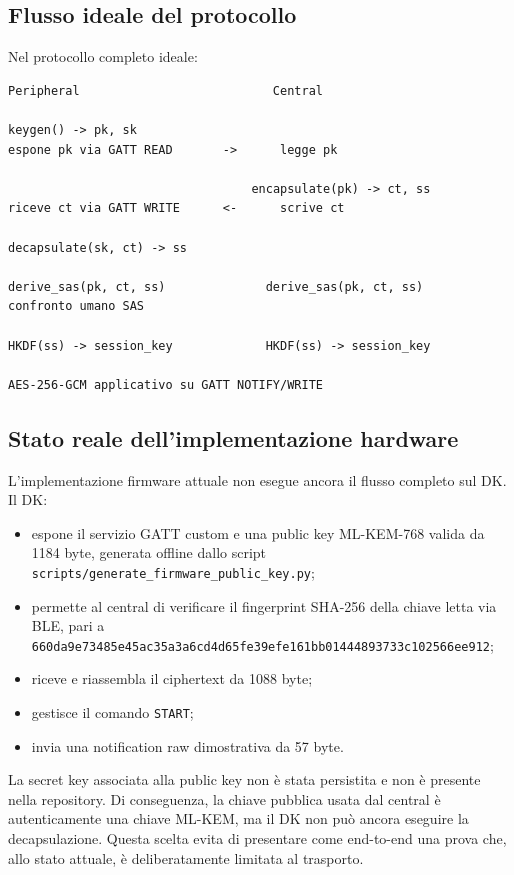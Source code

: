 \documentclass[11pt,a4paper]{article}
\providecommand{\tightlist}{\setlength{\itemsep}{0pt}\setlength{\parskip}{0pt}}
\newcommand{\passthrough}[1]{#1}
\begin{document}
\subsection{Flusso ideale del
protocollo}\label{flusso-ideale-del-protocollo}

Nel protocollo completo ideale:

\begin{lstlisting}
Peripheral                           Central

keygen() -> pk, sk
espone pk via GATT READ       ->      legge pk

                                  encapsulate(pk) -> ct, ss
riceve ct via GATT WRITE      <-      scrive ct

decapsulate(sk, ct) -> ss

derive_sas(pk, ct, ss)              derive_sas(pk, ct, ss)
confronto umano SAS

HKDF(ss) -> session_key             HKDF(ss) -> session_key

AES-256-GCM applicativo su GATT NOTIFY/WRITE
\end{lstlisting}

\subsection{Stato reale dell'implementazione
hardware}\label{stato-reale-dellimplementazione-hardware}

L'implementazione firmware attuale non esegue ancora il flusso completo
sul DK. Il DK:

\begin{itemize}
\tightlist
\item
  espone il servizio GATT custom e una public key ML-KEM-768 valida da
  1184 byte, generata offline dallo script
  \texttt{scripts/generate\_firmware\_public\_key.py};
\item
  permette al central di verificare il fingerprint SHA-256 della chiave
  letta via BLE, pari a
  \texttt{660da9e73485e45ac35a3a6cd4d65fe39efe161bb01444893733c102566ee912};
\item
  riceve e riassembla il ciphertext da 1088 byte;
\item
  gestisce il comando \passthrough{\lstinline!START!};
\item
  invia una notification raw dimostrativa da 57 byte.
\end{itemize}

La secret key associata alla public key non è stata persistita e non è
presente nella repository. Di conseguenza, la chiave pubblica usata dal
central è autenticamente una chiave ML-KEM, ma il DK non può ancora
eseguire la decapsulazione. Questa scelta evita di presentare come
end-to-end una prova che, allo stato attuale, è deliberatamente limitata
al trasporto.
\end{document}
